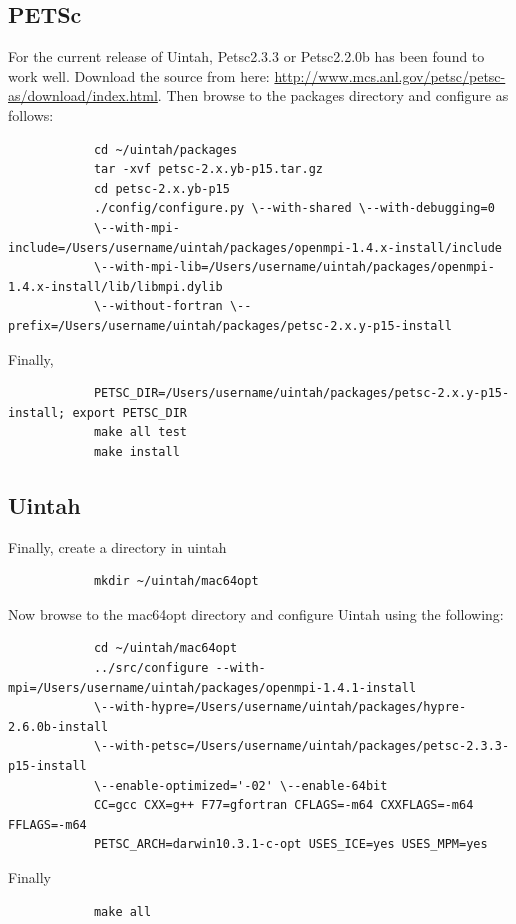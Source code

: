 \documentclass[12pt]{article}
\begin{document}
		\subsection{PETSc}
		For the current release of Uintah, Petsc2.3.3 or Petsc2.2.0b has been found to work well. Download the source from here: \url{http://www.mcs.anl.gov/petsc/petsc-as/download/index.html}.
		Then browse to the packages directory and configure as follows:
		{\small
		\begin{verbatim}
			cd ~/uintah/packages
			tar -xvf petsc-2.x.yb-p15.tar.gz
			cd petsc-2.x.yb-p15
			./config/configure.py \--with-shared \--with-debugging=0 
			\--with-mpi-include=/Users/username/uintah/packages/openmpi-1.4.x-install/include 
			\--with-mpi-lib=/Users/username/uintah/packages/openmpi-1.4.x-install/lib/libmpi.dylib 
			\--without-fortran \--prefix=/Users/username/uintah/packages/petsc-2.x.y-p15-install
		\end{verbatim}}
		Finally,
		{\small
		\begin{verbatim}
			PETSC_DIR=/Users/username/uintah/packages/petsc-2.x.y-p15-install; export PETSC_DIR
			make all test
			make install
		\end{verbatim}}
		
		\subsection{Uintah}
		Finally, create a directory in uintah
		{\small 
		\begin{verbatim}
			mkdir ~/uintah/mac64opt
		\end{verbatim}} %
		\noindent Now browse to the mac64opt directory and configure Uintah using the following:
		{\small
		\begin{verbatim}
			cd ~/uintah/mac64opt
			../src/configure --with-mpi=/Users/username/uintah/packages/openmpi-1.4.1-install 
			\--with-hypre=/Users/username/uintah/packages/hypre-2.6.0b-install 
			\--with-petsc=/Users/username/uintah/packages/petsc-2.3.3-p15-install 
			\--enable-optimized='-02' \--enable-64bit 
			CC=gcc CXX=g++ F77=gfortran CFLAGS=-m64 CXXFLAGS=-m64 FFLAGS=-m64
			PETSC_ARCH=darwin10.3.1-c-opt USES_ICE=yes USES_MPM=yes
		\end{verbatim}} %
		\noindent Finally
		{\small
		\begin{verbatim}
			make all
		\end{verbatim}}
\end{document}
